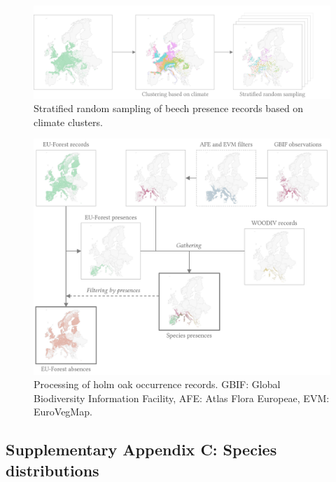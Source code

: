\hfill \break

\begin{figure}[htbp]
\centering \includegraphics{chapter1/figs/supp/presence_clustering} 
\caption{Stratified random sampling of beech presence records based on climate clusters.}\label{fig:pres_clustering}
\end{figure}

\begin{landscape}
\begin{figure}[htbp]
\centering \includegraphics{chapter1/figs/supp/occurrence_processing} 
\caption{Processing of holm oak occurrence records. GBIF: Global Biodiversity Information Facility, AFE: Atlas Flora Europeae, EVM: EuroVegMap.}\label{fig:occ_processing}
\end{figure}
\end{landscape}

\newpage

\newpage

\subsection{Supplementary Appendix C: Species
distributions}\label{chap1:appendixC}
\vspace*{3cm}

